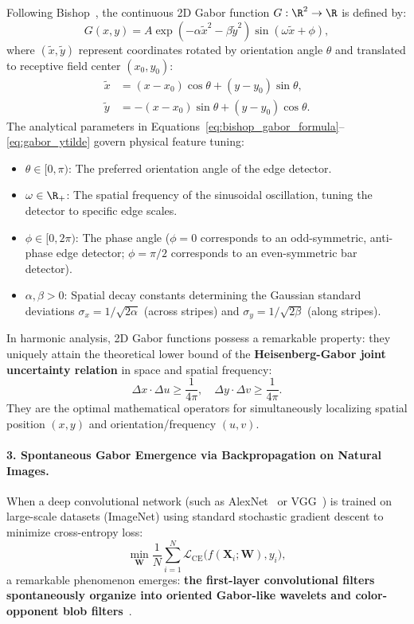 Following Bishop~\cite{bishop2024deep}, the continuous 2D Gabor function $G: \R^2 \to \R$ is defined by:
\begin{equation}
G(x, y) = A \exp\left( -\alpha \tilde{x}^2 - \beta \tilde{y}^2 \right) \sin(\omega \tilde{x} + \phi),
\label{eq:bishop_gabor_formula}
\end{equation}
where $(\tilde{x}, \tilde{y})$ represent coordinates rotated by orientation angle $\theta$ and translated to receptive field center $(x_0, y_0)$:
\begin{align}
\tilde{x} &= (x - x_0) \cos\theta + (y - y_0) \sin\theta, \label{eq:gabor_xtilde} \\
\tilde{y} &= -(x - x_0) \sin\theta + (y - y_0) \cos\theta. \label{eq:gabor_ytilde}
\end{align}
The analytical parameters in Equations~\eqref{eq:bishop_gabor_formula}--\eqref{eq:gabor_ytilde} govern physical feature tuning:
\begin{itemize}[noitemsep]
  \item $\theta \in [0, \pi)$: The preferred orientation angle of the edge detector.
  \item $\omega \in \R_+$: The spatial frequency of the sinusoidal oscillation, tuning the detector to specific edge scales.
  \item $\phi \in [0, 2\pi)$: The phase angle ($\phi = 0$ corresponds to an odd-symmetric, anti-phase edge detector; $\phi = \pi/2$ corresponds to an even-symmetric bar detector).
  \item $\alpha, \beta > 0$: Spatial decay constants determining the Gaussian standard deviations $\sigma_x = 1/\sqrt{2\alpha}$ (across stripes) and $\sigma_y = 1/\sqrt{2\beta}$ (along stripes).
\end{itemize}
In harmonic analysis, 2D Gabor functions possess a remarkable property: they uniquely attain the theoretical lower bound of the \textbf{Heisenberg-Gabor joint uncertainty relation} in space and spatial frequency:
\begin{equation}
\Delta x \cdot \Delta u \ge \frac{1}{4\pi}, \quad \Delta y \cdot \Delta v \ge \frac{1}{4\pi}.
\label{eq:heisenberg_gabor_uncertainty}
\end{equation}
They are the optimal mathematical operators for simultaneously localizing spatial position $(x, y)$ and orientation/frequency $(u, v)$.

\paragraph{3. Spontaneous Gabor Emergence via Backpropagation on Natural Images.}
When a deep convolutional network (such as AlexNet~\cite{krizhevsky2012imagenet} or VGG~\cite{simonyan2014very}) is trained on large-scale datasets (ImageNet) using standard stochastic gradient descent to minimize cross-entropy loss:
\begin{equation}
\min_{\mathbf{W}} \frac{1}{N} \sum_{i=1}^N \mathcal{L}_{\text{CE}}\big( f(\mathbf{X}_i; \mathbf{W}), y_i \big),
\end{equation}
a remarkable phenomenon emerges: \textbf{the first-layer convolutional filters spontaneously organize into oriented Gabor-like wavelets and color-opponent blob filters}~\cite{krizhevsky2012imagenet,bishop2024deep}.

